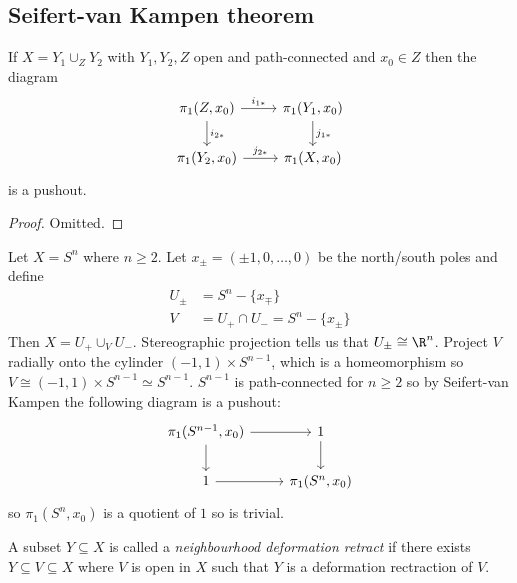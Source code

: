 \documentclass[a4paper]{article}
\begin{document}

\subsection{Seifert-van Kampen theorem}

\begin{theorem}
  If \(X = Y_1 \cup_Z Y_2\) with \(Y_1, Y_2, Z\) open and path-connected and \(x_0 \in Z\) then the diagram
  \[
    \begin{tikzcd}
      \pi_1(Z, x_0) \ar[r, "i_{1*}"] \ar[d, "i_{2*}"] & \pi_1(Y_1, x_0) \ar[d, "j_{1*}"] \\
      \pi_1(Y_2, x_0) \ar[r, "j_{2*}"] & \pi_1(X, x_0)
    \end{tikzcd}
  \]
  is a pushout.
\end{theorem}

\begin{proof}
  Omitted.
\end{proof}

\begin{eg}
  Let \(X = S^n\) where \(n \geq 2\). Let \(x_\pm = (\pm 1, 0, \dots, 0)\) be the north/south poles and define
  \begin{align*}
    U_\pm &= S^n - \{x_\mp\} \\
    V &=  U_+ \cap U_- = S^n - \{x_\pm\}
  \end{align*}
  Then \(X = U_+ \cup_V U_-\). Stereographic projection tells us that \(U_\pm \cong \R^n\). Project \(V\) radially onto the cylinder \((-1, 1) \times S^{n - 1}\), which is a homeomorphism so \(V \cong (-1, 1) \times S^{n - 1} \simeq S^{n - 1}\). \(S^{n - 1}\) is path-connected for \(n \geq 2\) so by Seifert-van Kampen the following diagram is a pushout:
  \[
    \begin{tikzcd}
      \pi_1(S^{n - 1}, x_0) \ar[r] \ar[d] & 1 \ar[d] \\
      1 \ar[r] & \pi_1(S^n, x_0)
    \end{tikzcd}
  \]
  so \(\pi_1(S^n, x_0)\) is a quotient of \(1\) so is trivial.
\end{eg}

\begin{definition}
  A subset \(Y \subseteq X\) is called a \emph{neighbourhood deformation retract} if there exists \(Y \subseteq V \subseteq X\) where \(V\) is open in \(X\) such that \(Y\) is a deformation rectraction of \(V\).
\end{definition}
\end{document}
